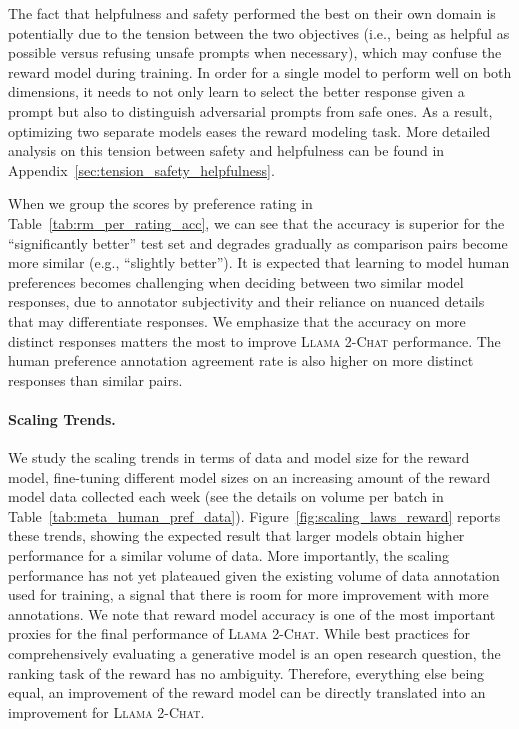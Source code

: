 The fact that helpfulness and safety performed the best on their own domain is potentially due to the tension between the two objectives (i.e., being as helpful as possible versus refusing unsafe prompts when necessary), which may confuse the reward model during training. In order for a single model to perform well on both dimensions, it needs to not only learn to select the better response given a prompt but also to distinguish adversarial prompts from safe ones. As a result, optimizing two separate models eases the reward modeling task. More detailed analysis on this tension between safety and helpfulness can be found in Appendix~\ref{sec:tension_safety_helpfulness}.

When we group the scores by preference rating in Table~\ref{tab:rm_per_rating_acc}, we can see that the accuracy is superior for the ``significantly better'' test set and degrades gradually as comparison pairs become more similar (e.g., ``slightly better''). It is expected that learning to model human preferences becomes challenging when deciding between two similar model responses, due to annotator subjectivity and their reliance on nuanced details that may differentiate responses. We emphasize that the accuracy on more distinct responses matters the most to improve \textsc{Llama 2-Chat} performance. The human preference annotation agreement rate is also higher on more distinct responses than similar pairs. 

\paragraph{Scaling Trends.}

We study the scaling trends in terms of data and model size for the reward model, fine-tuning different model sizes on an increasing amount of the reward model data collected each week (see the details on volume per batch in Table~\ref{tab:meta_human_pref_data}). Figure~\ref{fig:scaling_laws_reward} reports these trends, showing the expected result that larger models obtain higher performance for a similar volume of data. More importantly, the scaling performance has not yet plateaued given the existing volume of data annotation used for training, a signal that there is room for more improvement with more annotations. We note that reward model accuracy is one of the most important proxies for the final performance of \textsc{Llama 2-Chat}. While best practices for comprehensively evaluating a generative model is an open research question, the ranking task of the reward has no ambiguity. Therefore, everything else being equal, an improvement of the reward model can be directly translated into an improvement for \textsc{Llama 2-Chat}.


